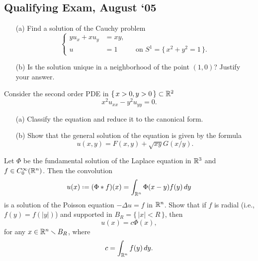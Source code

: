 \subsection{Qualifying Exam, August `05}
\begin{problem}
  \hfill
  \begin{itemize}[noitemsep]
  \item[(a)] Find a solution of the Cauchy problem
    \[
      \left\{
        \begin{aligned}
          yu_x+xu_y&=xy,\\
          u&=1&&\text{on \(S^1=\bigl\{\,x^2+y^2=1\,\bigr\}\)}.
        \end{aligned}
      \right.
    \]
  \item[(b)] Is the solution unique in a neighborhood of the point
    \((1,0)\)? Justify your answer.
  \end{itemize}
\end{problem}
\begin{solution}
\end{solution}

\begin{problem}
  Consider the second order PDE in \(\{\,x>0,y>0\,\}\subset\mathbb{R}^2\)
  \[
    x^2u_{xx}-y^2u_{yy}=0.
  \]
  \begin{itemize}[noitemsep]
  \item[(a)] Classify the equation and reduce it to the canonical form.
  \item[(b)] Show that the general solution of the equation is given by the
    formula
    \[
      u(x,y)=F(x,y)+\sqrt{xy}G(x/y).
    \]
  \end{itemize}
\end{problem}
\begin{solution}
\end{solution}

\begin{problem}
  Let \(\Phi\) be the fundamental solution of the Laplace equation in
  \(\mathbb{R}^3\) and \(f\in C_0^\infty(\mathbb{R}^n)\). Then the convolution
  \[
    u(x)\defeq(\Phi*f)(x)=\int_{\bbR^n}\Phi(x-y)f(y)\diff y
  \]
  is a solution of the Poisson equation \(-\Delta u=f\) in \(\mathbb{R}^n\). Show
  that if \(f\) is radial (i.e., \(f(y)=f(|y|)\)) and supported in
  \(B_R=\{\,|x|<R\,\}\), then
  \[
    u(x)=c\Phi(x),
  \]
  for any \(x\in\mathbb{R}^n\smallsetminus B_R\), where
  \[
    c=\int_{\mathbb{R}^n}f(y)\mathop{}\!d y.
  \]

\end{problem}
\begin{solution}
\end{solution}

